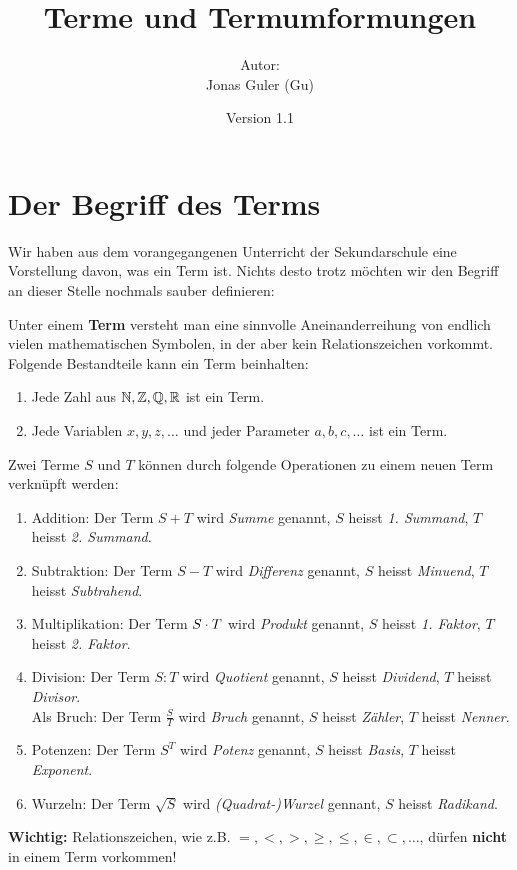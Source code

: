 \documentclass[11pt,oneside]{article}
\newcommand{\Skriptname}{Terme und Termumformungen}
\newcommand{\Autor}{Jonas Guler (Gu)}
\begin{document}
\begin{titlepage}
	\clearpage
	\title{\Huge\textbf{\Skriptname} \\[1cm]}
	\author{Autor:\\ \Autor}
	\date{\normalsize {Version 1.1}\\ \datelong}
	\maketitle
    \thispagestyle{empty}
    \vfill
    \tableofcontents
\end{titlepage}
\section{Der Begriff des Terms}
    Wir haben aus dem vorangegangenen Unterricht der Sekundarschule eine Vorstellung davon, was ein Term ist. Nichts desto trotz möchten wir den Begriff an dieser Stelle nochmals sauber definieren:
    \begin{definition}
        Unter einem \textbf{Term} versteht man eine sinnvolle Aneinanderreihung von endlich vielen mathematischen Symbolen, in der aber kein Relationszeichen vorkommt.\\
    	Folgende Bestandteile kann ein Term beinhalten:
    	\begin{enumerate}[label=\ ]
    		\item Jede Zahl aus $\mathbb{N},\mathbb{Z},\mathbb{Q},\mathbb{R}$ ist ein Term.
    		\item Jede Variablen $x,y,z,\ldots$ und jeder Parameter $a,b,c,\ldots$ ist ein Term.
    	\end{enumerate}
    	Zwei Terme $S$ und $T$ können durch folgende Operationen zu einem neuen Term verkn\"upft werden:
    	\begin{enumerate}[label=\ ]
    		\item Addition: Der Term $S+T$ wird \emph{Summe} genannt, $S$ heisst \emph{1. Summand}, $T$ heisst \emph{2. Summand}.
    		\item Subtraktion: Der Term $S-T$ wird \emph{Differenz} genannt, $S$ heisst \emph{Minuend}, $T$ heisst \emph{Subtrahend}.
    		\item Multiplikation: Der Term $S\cdot T$ wird \emph{Produkt} genannt, $S$ heisst \emph{1. Faktor}, $T$ heisst \emph{2. Faktor}.
    		\item Division: Der Term $S:T$ wird \emph{Quotient} genannt, $S$ heisst \emph{Dividend}, $T$ heisst \emph{Divisor}. \\
    		Als Bruch: Der Term $\frac{S}{T}$ wird \emph{Bruch} genannt, $S$ heisst \emph{Zähler}, $T$ heisst \emph{Nenner}.
    		\item Potenzen: Der Term $S^{T}$ wird \emph{Potenz} genannt, $S$ heisst \emph{Basis}, $T$ heisst \emph{Exponent}.
    		\item Wurzeln: Der Term $\sqrt{S}$ wird \emph{(Quadrat-)Wurzel} gennant, $S$ heisst \emph{Radikand}.
    	\end{enumerate}
        \textbf{Wichtig:} Relationszeichen, wie z.B. $=,<,>,\geq,\leq,\in,\subset,\ldots$, dürfen \textbf{nicht} in einem Term vorkommen!
    \end{definition}
\end{document}
